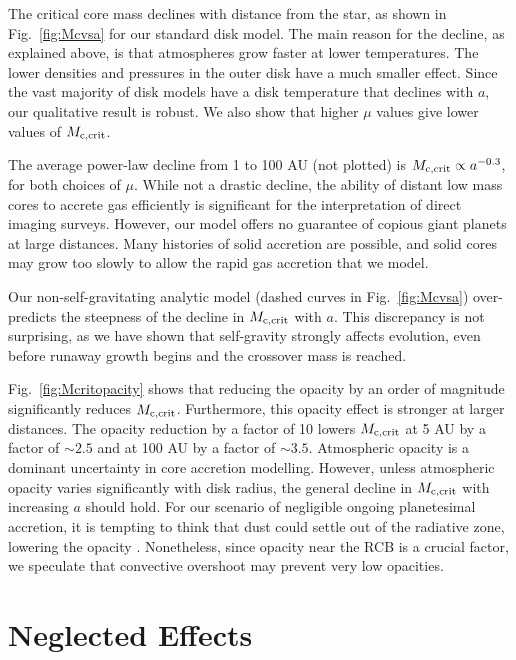 \documentclass[apj, numberedappendix]{emulateapj}
\newcommand{\Fig}[1]{Fig.~\ref{#1}}
\def\crit{_{\rm{c, crit}}}
\begin{document}
The critical core mass declines with distance from the star, as shown in \Fig{fig:Mcvsa} for our standard disk model.   The main reason for the decline, as explained above, is that atmospheres grow faster at lower temperatures.  The lower densities and pressures in the outer disk have a much smaller effect.  Since the vast majority of disk models have a disk temperature that declines with $a$, our qualitative result is robust.   We also show that higher $\mu$ values give lower values of $M\crit$.

The average power-law decline from 1 to 100 AU (not plotted) is $M\crit \propto a^{-0.3}$, for both choices of $\mu$.   While not a drastic decline, the ability of distant low mass cores to accrete gas efficiently is significant for the interpretation of direct imaging surveys.  However, our model offers no guarantee of copious giant planets at large distances.  Many histories of solid accretion are possible, and solid cores may grow too slowly to allow the rapid gas accretion that we model.  

Our non-self-gravitating analytic model (dashed curves in \Fig{fig:Mcvsa}) over-predicts the steepness of the decline in $M\crit$ with $a$.  This discrepancy is not surprising, as we have shown that self-gravity strongly affects evolution, even before runaway growth begins and the crossover mass is reached.

\Fig{fig:Mcritopacity} shows that reducing the opacity by an order of magnitude significantly reduces $M\crit$.  Furthermore, this opacity effect is stronger at larger distances.  The opacity reduction by a factor of 10 lowers $M\crit$ at 5 AU by a factor of $\sim$$2.5$ and at 100 AU by a factor of $\sim$$3.5$.  Atmospheric opacity is a dominant uncertainty in core accretion modelling.  However, unless atmospheric opacity varies significantly with disk radius, the general decline in $M\crit$ with increasing $a$ should hold.  For our scenario of negligible ongoing planetesimal accretion, it is tempting to think that dust could settle out of the radiative zone, lowering the opacity \citep{podolak03}.  Nonetheless, since opacity near the RCB is a crucial factor, we speculate that convective overshoot may prevent very low opacities.

\section{Neglected Effects}\label{sec:neglected}
\end{document}
